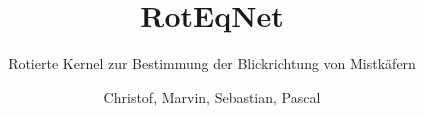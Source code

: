 \documentclass{beamer}
\author{Christof, Marvin, Sebastian, Pascal}
\title{RotEqNet}
\subtitle{Rotierte Kernel zur Bestimmung der Blickrichtung von Mistkäfern}
\begin{document}
%



\begin{frame}[plain]
  \maketitle
\end{frame}


\end{document}
